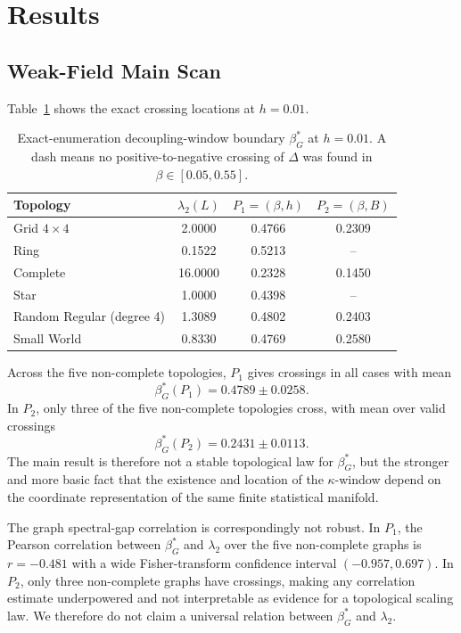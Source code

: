 \documentclass[11pt,a4paper]{article}
\begin{document}
\section{Results}
\label{sec:results}

\subsection{Weak-Field Main Scan}
\label{subsec:window}

Table~\ref{tab:per_topology} shows the exact crossing locations at $h=0.01$.

\begin{table}[ht]
\centering
\caption{Exact-enumeration decoupling-window boundary $\beta_G^*$ at $h=0.01$.  A dash means no positive-to-negative crossing of $\Delta$ was found in $\beta\in[0.05,0.55]$.}
\label{tab:per_topology}
\begin{tabular}{lccc}
\toprule
Topology & $\lambda_2(L)$ & $P_1=(\beta,h)$ & $P_2=(\beta,B)$\\
\midrule
Grid $4\times4$ & 2.0000 & 0.4766 & 0.2309\\
Ring & 0.1522 & 0.5213 & --\\
Complete & 16.0000 & 0.2328 & 0.1450\\
Star & 1.0000 & 0.4398 & --\\
Random Regular (degree 4) & 1.3089 & 0.4802 & 0.2403\\
Small World & 0.8330 & 0.4769 & 0.2580\\
\bottomrule
\end{tabular}
\end{table}

Across the five non-complete topologies, $P_1$ gives crossings in all cases with mean
\begin{equation}
\beta_G^*(P_1)=0.4789\pm0.0258.
\end{equation}
In $P_2$, only three of the five non-complete topologies cross, with mean over valid crossings
\begin{equation}
\beta_G^*(P_2)=0.2431\pm0.0113.
\end{equation}
The main result is therefore not a stable topological law for $\beta_G^*$, but the stronger and more basic fact that the existence and location of the $\kappa$-window depend on the coordinate representation of the same finite statistical manifold.

The graph spectral-gap correlation is correspondingly not robust.  In $P_1$, the Pearson correlation between $\beta_G^*$ and $\lambda_2$ over the five non-complete graphs is $r=-0.481$ with a wide Fisher-transform confidence interval $(-0.957,0.697)$.  In $P_2$, only three non-complete graphs have crossings, making any correlation estimate underpowered and not interpretable as evidence for a topological scaling law.  We therefore do not claim a universal relation between $\beta_G^*$ and $\lambda_2$.
\end{document}
